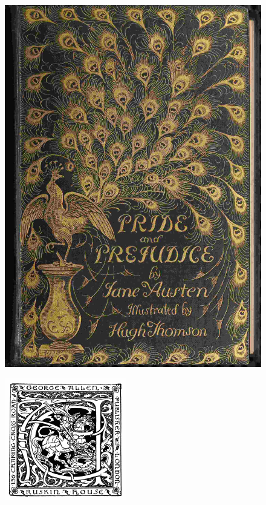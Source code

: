\documentclass[10pt]{book}
\begin{document}
\begin{figure}[h]
\centering
\includegraphics[width=\linewidth]{images/cover.jpg}
\end{figure}

\begin{figure}[h]
\centering
\includegraphics[width=\linewidth]{images/colophon.png}
\end{figure}
\end{document}
